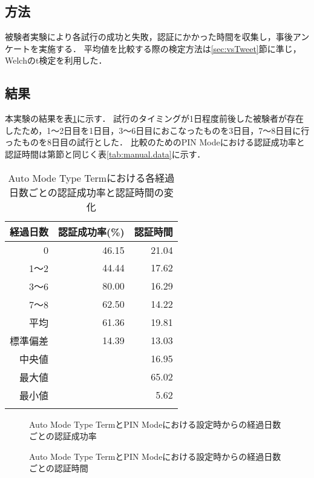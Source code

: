 \subsection{方法}
被験者実験により各試行の成功と失敗，認証にかかった時間を収集し，事後アンケートを実施する．
平均値を比較する際の検定方法は\ref{sec:vsTweet}節に準じ，Welchのt検定を利用した．

\subsection{結果}
本実験の結果を表\ref{tab:auto_term.data}に示す．
試行のタイミングが1日程度前後した被験者が存在したため，1〜2日目を1日目，3〜6日目におこなったものを3日目，7〜8日目に行ったものを8日目の試行とした．
比較のためのPIN Modeにおける認証成功率と認証時間は第\label{sec:vsManual}節と同じく表\ref{tab:manual.data}に示す．
\begin{table}[ht]
  \caption{Auto Mode Type Termにおける各経過日数ごとの認証成功率と認証時間の変化}
  \label{tab:auto_term.data}
  \begin{center}
    \small
    \begin{tabular}{rrr}
      \bhline
      経過日数 & 認証成功率(\%) & 認証時間\\ \hline
      0 & 46.15 & 21.04 \\
      1〜2 & 44.44 & 17.62 \\
      3〜6 & 80.00 & 16.29 \\
      7〜8 & 62.50 & 14.22 \\ \hline \hline
      平均 & 61.36 & 19.81 \\
      標準偏差 & 14.39 & 13.03 \\
      中央値 & & 16.95 \\
      最大値 & & 65.02 \\
      最小値 & & 5.62 \\
      \bhline
    \end{tabular}
  \end{center}
\end{table}

\begin{figure}[ht]
  \begin{center}
  \end{center}
  \caption{Auto Mode Type TermとPIN Modeにおける設定時からの経過日数ごとの認証成功率}
  \label{fig:ex_auto_term_vs_pin_rate}
\end{figure}

\begin{figure}[hb]
  \begin{center}
  \end{center}
  \caption{Auto Mode Type TermとPIN Modeにおける設定時からの経過日数ごとの認証時間}
  \label{fig:ex_auto_term_vs_pin_time}
\end{figure}

